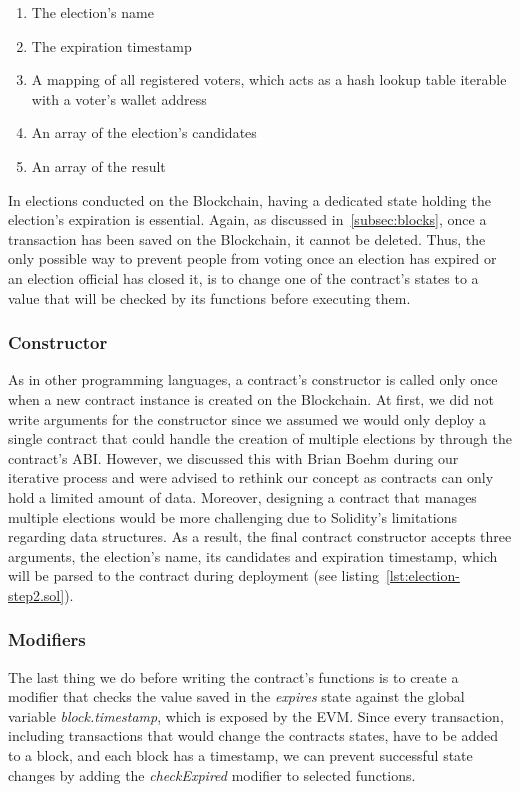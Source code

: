 \begin{enumerate}
    \item The election's name
    \item The expiration timestamp
    \item A mapping of all registered voters, which acts as a hash lookup table iterable with a voter's wallet address~\autocite[137]{antonopoulos_mastering_2019}
    \item An array of the election's candidates
    \item An array of the result
\end{enumerate}

In elections conducted on the \gls{Blockchain}, having a dedicated state holding the election's expiration is essential.
Again, as discussed in~\cref{subsec:blocks}, once a transaction has been saved on the \gls{Blockchain}, it cannot be deleted.
Thus, the only possible way to prevent people from voting once an election has expired or an election official has closed it, is to change one of the contract's states to a value that will be checked by its functions before executing them.

\subsubsection{Constructor}

As in other programming languages, a contract's constructor is called only once when a new contract instance is created on the \gls{Blockchain}.
At first, we did not write arguments for the constructor since we assumed we would only deploy a single contract that could handle the creation of multiple elections by  through the contract's \gls{ABI}.
However, we discussed this with Brian Boehm during our iterative process and were advised to rethink our concept as contracts can only hold a limited amount of data.
Moreover, designing a contract that manages multiple elections would be more challenging due to Solidity's limitations regarding data structures.
As a result, the final contract constructor accepts three arguments, the election's name, its candidates and expiration timestamp, which will be parsed to the contract during deployment (see listing~\ref{lst:election-step2.sol}).

\subsubsection{Modifiers}

The last thing we do before writing the contract's functions is to create a modifier that checks the value saved in the \emph{expires} state against the global variable \emph{block.timestamp}, which is exposed by the \gls{EVM}.
Since every transaction, including transactions that would change the contracts states, have to be added to a block, and each block has a timestamp, we can prevent successful state changes by adding the \emph{checkExpired} modifier to selected functions.

